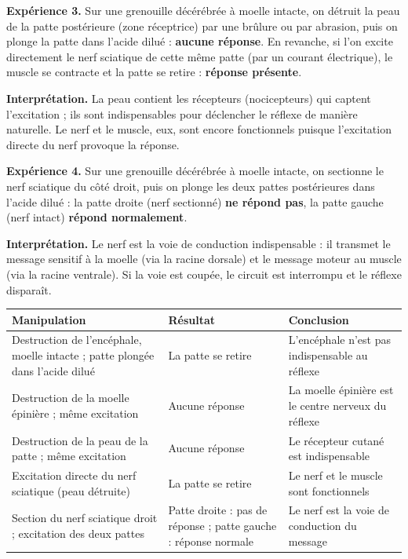 \documentclass[11pt]{article}
\newcommand{\cle}[1]{{\popxbold\color{popdark}#1}}
\begin{document}
\begin{experience}
\textbf{Expérience 3.} Sur une grenouille décérébrée à moelle intacte, on détruit la peau de la patte postérieure (zone réceptrice) par une brûlure ou par abrasion, puis on plonge la patte dans l'acide dilué : \textbf{aucune réponse}. En revanche, si l'on excite directement le nerf sciatique de cette même patte (par un courant électrique), le muscle se contracte et la patte se retire : \textbf{réponse présente}.

\textbf{Interprétation.} La peau contient les \cle{récepteurs} (nocicepteurs) qui captent l'excitation ; ils sont indispensables pour déclencher le réflexe de manière naturelle. Le nerf et le muscle, eux, sont encore fonctionnels puisque l'excitation directe du nerf provoque la réponse.

\textbf{Expérience 4.} Sur une grenouille décérébrée à moelle intacte, on sectionne le nerf sciatique du côté droit, puis on plonge les deux pattes postérieures dans l'acide dilué : la patte droite (nerf sectionné) \textbf{ne répond pas}, la patte gauche (nerf intact) \textbf{répond normalement}.

\textbf{Interprétation.} Le nerf est la \cle{voie de conduction} indispensable : il transmet le message sensitif à la moelle (via la racine dorsale) et le message moteur au muscle (via la racine ventrale). Si la voie est coupée, le circuit est interrompu et le réflexe disparaît.
\end{experience}

\begin{center}
\begin{tabularx}{\linewidth}{|X|X|X|}
\hline
\rowcolor{popblueL} \textbf{Manipulation} & \textbf{Résultat} & \textbf{Conclusion} \\
\hline
Destruction de l'encéphale, moelle intacte ; patte plongée dans l'acide dilué & La patte se retire & L'encéphale n'est pas indispensable au réflexe \\
\hline
Destruction de la moelle épinière ; même excitation & Aucune réponse & La moelle épinière est le centre nerveux du réflexe \\
\hline
Destruction de la peau de la patte ; même excitation & Aucune réponse & Le récepteur cutané est indispensable \\
\hline
Excitation directe du nerf sciatique (peau détruite) & La patte se retire & Le nerf et le muscle sont fonctionnels \\
\hline
Section du nerf sciatique droit ; excitation des deux pattes & Patte droite : pas de réponse ; patte gauche : réponse normale & Le nerf est la voie de conduction du message \\
\hline
\end{tabularx}
\end{center}
\end{document}
